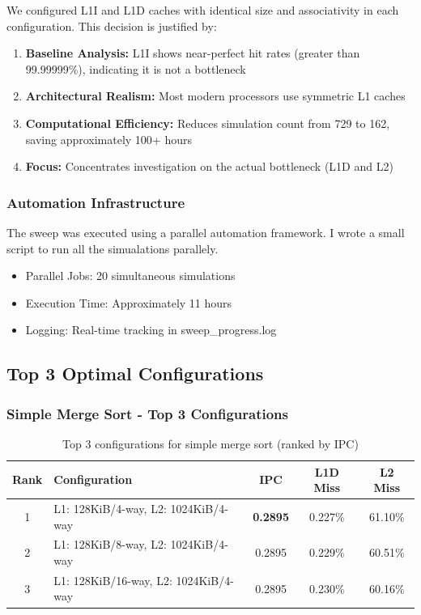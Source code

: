 \documentclass[12pt,a4paper]{article}
\begin{document}
We configured L1I and L1D caches with identical size and associativity in each configuration. This decision is justified by:

\begin{enumerate}
    \item \textbf{Baseline Analysis:} L1I shows near-perfect hit rates (greater than 99.99999\%), indicating it is not a bottleneck
    \item \textbf{Architectural Realism:} Most modern processors use symmetric L1 caches
    \item \textbf{Computational Efficiency:} Reduces simulation count from 729 to 162, saving approximately 100+ hours
    \item \textbf{Focus:} Concentrates investigation on the actual bottleneck (L1D and L2)
\end{enumerate}

\subsubsection{Automation Infrastructure}

The sweep was executed using a parallel automation framework.
I wrote a small script to run all the simualations parallely.

\begin{itemize}
    \item Parallel Jobs: 20 simultaneous simulations
    \item Execution Time: Approximately 11 hours
    \item Logging: Real-time tracking in sweep\_progress.log
\end{itemize}

\subsection{Top 3 Optimal Configurations}

\subsubsection{Simple Merge Sort - Top 3 Configurations}

\begin{table}[H]
\centering
\begin{tabular}{clccc}
\toprule
\textbf{Rank} & \textbf{Configuration} & \textbf{IPC} & \textbf{L1D Miss} & \textbf{L2 Miss} \\
\midrule
1 & L1: 128KiB/4-way, L2: 1024KiB/4-way & \textbf{0.2895} & 0.227\% & 61.10\% \\
2 & L1: 128KiB/8-way, L2: 1024KiB/4-way & 0.2895 & 0.229\% & 60.51\% \\
3 & L1: 128KiB/16-way, L2: 1024KiB/4-way & 0.2895 & 0.230\% & 60.16\% \\
\bottomrule
\end{tabular}
\caption{Top 3 configurations for simple merge sort (ranked by IPC)}
\label{tab:top3_simple}
\end{table}
\end{document}
